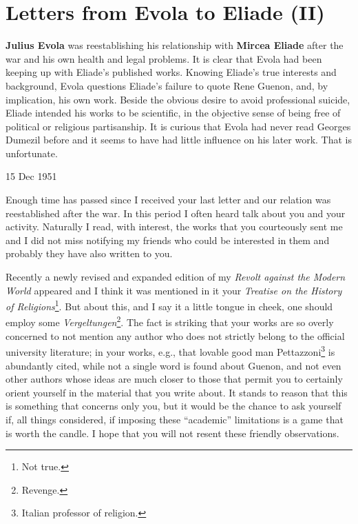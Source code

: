 \section{Letters from Evola to Eliade (II)}

\begin{quotex}
\textbf{Julius Evola} was reestablishing his relationship with \textbf{Mircea Eliade} after the war and his own health and legal problems. It is clear that Evola had been keeping up with Eliade's published works. Knowing Eliade's true interests and background, Evola questions Eliade's failure to quote Rene Guenon, and, by implication, his own work. Beside the obvious desire to avoid professional suicide, Eliade intended his works to be scientific, in the objective sense of being free of political or religious partisanship. It is curious that Evola had never read Georges Dumezil before and it seems to have had little influence on his later work. That is unfortunate.
\end{quotex}


15 Dec 1951

Enough time has passed since I received your last letter and our relation was reestablished after the war. In this period I often heard talk about you and your activity. Naturally I read, with interest, the works that you courteously sent me and I did not miss notifying my friends who could be interested in them and probably they have also written to you.

Recently a newly revised and expanded edition of my \emph{Revolt against the Modern World} appeared and I think it was mentioned in it your \emph{Treatise on the History of Religions}\footnote{Not true.}. But about this, and I say it a little tongue in cheek, one should employ some \emph{Vergeltungen}\footnote{Revenge.}. The fact is striking that your works are so overly concerned to not mention any author who does not strictly belong to the official university literature; in your works, e.g., that lovable good man Pettazzoni\footnote{Italian professor of religion.} is abundantly cited, while not a single word is found about Guenon, and not even other authors whose ideas are much closer to those that permit you to certainly orient yourself in the material that you write about. It stands to reason that this is something that concerns only you, but it would be the chance to ask yourself if, all things considered, if imposing these ``academic'' limitations is a game that is worth the candle. I hope that you will not resent these friendly observations.


